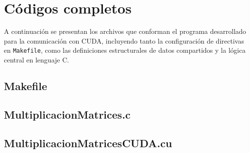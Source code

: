 %
%

\appendix
\renewcommand{\appendixname}{Anexo}
\renewcommand{\appendixpagename}{Anexos}
\renewcommand{\appendixtocname}{Anexos}
\addappheadtotoc
\appendixpage

\chapter{Códigos completos}
\label{chap:codigos_completos}


A continuación se presentan los archivos que conforman el programa desarrollado para la comunicación con CUDA, incluyendo tanto la configuración de directivas en \texttt{Makefile}, como las definiciones estructurales de datos compartidos y la lógica central en lenguaje C. 

\section{Makefile}


\section{MultiplicacionMatrices.c}


\section{MultiplicacionMatricesCUDA.cu}


